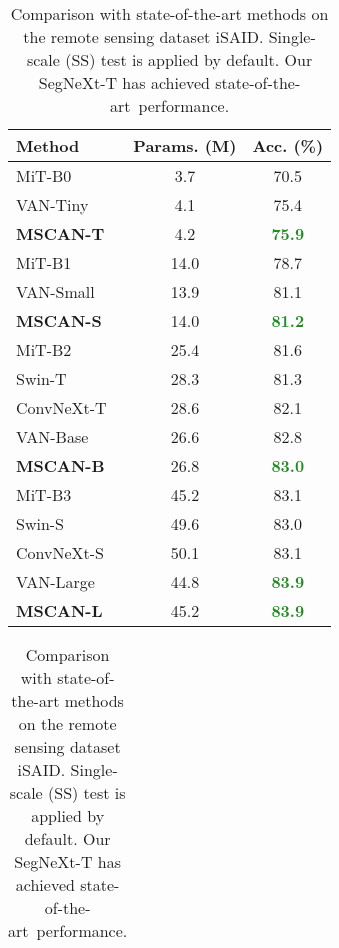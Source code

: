 \documentclass{article}
\def\sArt{state-of-the-art~}
\begin{document}
\begin{table}[t]
\vspace{-0.2cm}
  \footnotesize
  \begin{minipage}{0.46 \textwidth}
  \centering
  \setlength{\tabcolsep}{2mm}
\caption{
Comparison with state-of-the-art methods on ImageNet validation set. `Acc.' denotes Top-1 accuracy.
}
\begin{tabular}{l|c|c}
\toprule
	Method & Params. (M)  & Acc. (\%)  \\
    \midrule
    MiT-B0~\cite{xie2021segformer} & 3.7 & 70.5 \\
	VAN-Tiny~\cite{guo2022visual} & 4.1  & 75.4 \\ 
	\textbf{MSCAN-T} & 4.2 & \textbf{\textcolor{ForestGreen}{75.9}} \\ 
	\midrule
	MiT-B1~\cite{xie2021segformer} & 14.0 & 78.7  \\
	{VAN-Small~\cite{guo2022visual} } & 13.9 & {81.1} \\ 
	\textbf{MSCAN-S } & 14.0 & \textbf{\textcolor{ForestGreen}{81.2}} \\ 
	\midrule
	MiT-B2~\cite{xie2021segformer}   &25.4  &81.6 \\
	Swin-T~\cite{liu2021swin} & 28.3 & 81.3 \\
	ConvNeXt-T~\cite{liu2022convnet} & 28.6  & 82.1 \\  
	{VAN-Base~\cite{guo2022visual} } & 26.6 & {82.8} \\
	\textbf{MSCAN-B} & 26.8 & \textbf{\textcolor{ForestGreen}{83.0}} \\
	\midrule
	MiT-B3~\cite{he2016deep}  & 45.2  & 83.1\\
	Swin-S ~\cite{liu2021swin} & 49.6 & 83.0 \\
	ConvNeXt-S ~\cite{liu2021swin} & 50.1  & 83.1 \\
    {VAN-Large~\cite{guo2022visual}} & 44.8 & \textbf{\textcolor{ForestGreen}{83.9}} \\
    \textbf{MSCAN-L} & 45.2 & \textbf{\textcolor{ForestGreen}{83.9}} \\
\bottomrule
\end{tabular}
\label{tab:imagenet_cls}
\end{minipage}
\hfill
  \begin{minipage}{0.5\textwidth}
  \centering
  \setlength{\tabcolsep}{1.8mm}
  \caption{Comparison with state-of-the-art methods on the remote sensing dataset iSAID.
  Single-scale (SS) test is applied by default. Our SegNeXt-T has achieved \sArt performance.
  }
  \begin{tabular}{l|c|c} 

\end{tabular}
\end{minipage}
\end{table}
\end{document}
